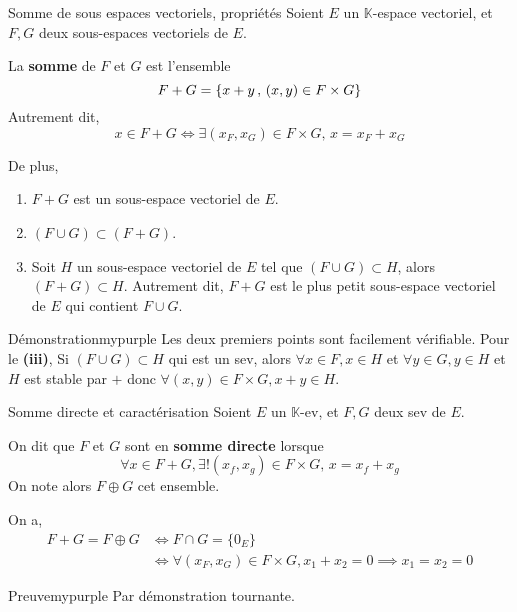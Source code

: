     \begin{defitheo}{Somme de sous espaces vectoriels, propriétés}{}
        Soient $E$ un $\mathbb{K}$-espace vectoriel, et $F,G$ deux sous-espaces vectoriels de $E$.

        La \textbf{somme} de $F$ et $G$ est l’ensemble 
        \[ F + G = \left\{ x+y \, , \, (x,y) \in F \times G \right\} \]
        Autrement dit, 
        \[ x \in F + G \iff \exists (x_F,x_G) \in F \times G,\, x = x_F + x_G \]

        De plus, 
        \begin{enumerate}
            \item $F + G$ est un sous-espace vectoriel de $E$.
            \item $(F \cup G) \subset (F + G)$.
            \item Soit $H$ un sous-espace vectoriel de $E$ tel que $(F \cup G) \subset H$, alors $(F + G) \subset H$. Autrement dit, $F + G$ est le plus petit sous-espace vectoriel de $E$ qui contient $F \cup G$.
        \end{enumerate}
    \end{defitheo}

    \begin{demo}{Démonstration}{mypurple}
        Les deux premiers points sont facilement vérifiable. Pour le \textbf{(iii)}, Si $(F \cup G) \subset H$ qui est un sev, alors $\forall x \in F, x \in H$ et $\forall y \in G, y \in H$ et $H$ est stable par $+$ donc $\forall (x,y) \in F \times G, x+y \in H$.
    \end{demo}

    \begin{defitheo}{Somme directe et caractérisation}{}
        Soient $E$ un $\mathbb{K}$-ev, et $F,G$ deux sev de $E$.

        On dit que $F$ et $G$ sont en \textbf{somme directe} lorsque 
        \[ \forall x \in F+G, \exists ! (x_f, x_g) \in F \times G, \, x = x_f + x_g \] 
        On note alors $F \oplus G$ cet ensemble.

        On a, 
        \begin{align*}
            F + G = F \oplus G 
            &\iff F \cap G = \{ 0_E \} \\
            &\iff \forall (x_F, x_G) \in F \times G, x_1 + x_2 = 0 \implies x_1 = x_2 = 0
        \end{align*}
    \end{defitheo}

    \begin{demo}{Preuve}{mypurple}
        Par démonstration tournante.
    \end{demo}

